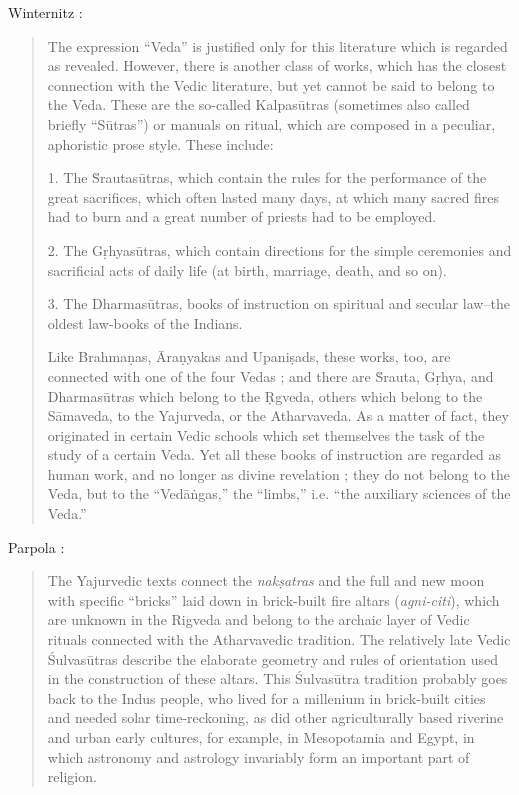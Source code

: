 \documentclass{article}
\begin{document}
Winternitz \cite[pp.~55--56]{winternitz}:

\begin{quote}
The expression ``Veda'' is justified only for this literature
which is regarded as revealed. However, there is another
class of works, which has the closest connection with the
Vedic literature, but yet cannot be said to belong to the
Veda. These are the so-called Kalpas\=utras (sometimes also
called briefly ``S\=utras'') or manuals on ritual, which are
composed in a peculiar, aphoristic prose style. These
include:

1. The \u{S}rautas\=utras, which contain the rules for the
performance of the great sacrifices, which often lasted many
days, at which many sacred fires had to burn and a great
number of priests had to be employed.

2. The G\d{r}hyas\=utras, which contain directions for the
simple ceremonies and sacrificial acts of daily life (at birth,
marriage, death, and so on).

3. The Dharmas\=utras, books of instruction on spiritual
and secular law--the oldest law-books of the Indians.

Like Brahma\d{n}as, \={A}ra\d{n}yakas and Upani\d{s}ads, these works,
too, are connected with one of the four Vedas ; and there
are \u{S}rauta, G\d{r}hya, and Dharmas\=utras which belong to the
\d{R}gveda, others which belong to the S\=amaveda, to the
Yajurveda, or the Atharvaveda. As a matter of fact, they
originated in certain Vedic schools which set themselves the
task of the study of a certain Veda. Yet all these books of
instruction are regarded as human work, and no longer as
divine revelation ; they do not belong to the Veda, but to
the ``Ved\=a\.{n}gas,'' the ``limbs,'' i.e. ``the auxiliary sciences
of the Veda.''
\end{quote}

Parpola \cite[p.~187]{parpola}:

\begin{quote}
The Yajurvedic texts connect the {\em nak\d{s}atras} and
the full and new moon with specific ``bricks'' laid down in brick-built fire altars ({\em agni-citi}),
which are unknown in the Rigveda and belong to the archaic layer of Vedic rituals connected
with the Atharvavedic tradition. The relatively late Vedic \'Sulvas\=utras describe
the elaborate geometry and rules of orientation used in the construction of these altars. This
\'Sulvas\=utra tradition probably goes back to the Indus people, who lived for a millenium in
brick-built cities and needed solar time-reckoning, as did other agriculturally based riverine
and urban early cultures, for example, in Mesopotamia and Egypt, in which astronomy and
astrology invariably form an important part of religion.
\end{quote}
\end{document}
